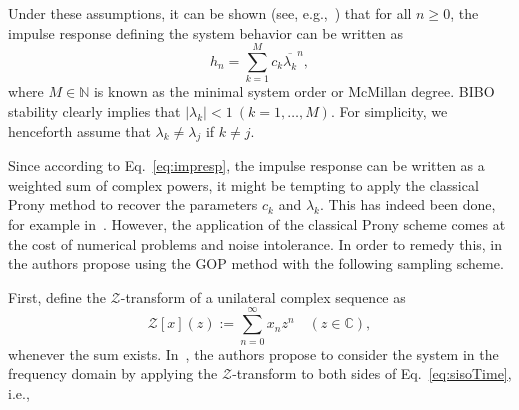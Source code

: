 \documentclass{arxiv}
\begin{document}

Under these assumptions, it can be shown (see, e.g.,~\cite{vandenhof, dozsa2025system}) that for all $n \ge 0$, the impulse response defining the system behavior can be written as
\begin{equation}
    \label{eq:impresp}
    h_n = \sum_{k=1}^{M} c_k \overline{\lambda_k}^n,
\end{equation}
where $M \in \mathbb{N}$ is known as the minimal system order or McMillan degree. 
BIBO stability clearly implies that $|\lambda_k| < 1 \ (k=1,\ldots,M)$. For simplicity, we henceforth assume that $\lambda_k \neq \lambda_j$ if $k \neq j$.

Since according to Eq.~\eqref{eq:impresp}, the impulse response can be written as a weighted sum of complex powers, it might be tempting to apply the classical Prony method to recover the parameters $c_k$ and $\lambda_k$. This has indeed been done, for example in~\cite{foyen2018prony}. However, the application of the classical Prony scheme comes at the cost of numerical problems and noise intolerance. In order to remedy this, in~\cite{dozsa2025system} the authors propose using the GOP method with the following sampling scheme. 

First, define the $\mathcal{Z}$-transform of a unilateral complex sequence as
\begin{equation}
    \label{eq:ztrans}
    \mathcal{Z}[x](z) := \sum_{n=0}^{\infty} x_n z^n \quad (z \in \mathbb{C}), 
\end{equation}
whenever the sum exists. In~\cite{dozsa2025system}, the authors propose to consider the system in the frequency domain by applying the $\mathcal{Z}$-transform to both sides of Eq.~\eqref{eq:sisoTime}, i.e., 
\end{document}
